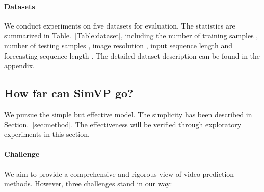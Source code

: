 \documentclass[10pt,twocolumn,letterpaper]{article}
\begin{document}
\paragraph{Datasets} We conduct experiments on five datasets for evaluation. The statistics are summarized in Table.~\ref{Table:dataset}, including the number of training samples , number of testing samples , image resolution , input sequence length  and forecasting sequence length . The detailed dataset description can be found in the appendix.

\begin{table}[h]
  \centering
  \caption{The statistics of datasets. The training or testing set has  or  samples, each of which consists  or  images with the shape .}
  
      \label{Table:dataset}
\end{table}


\vspace{-3mm}
\subsection{How far can SimVP go?}
We pursue the simple but effective model. The simplicity has been described in Section.~\ref{sec:method}. The effectiveness will be verified through exploratory experiments in this section.


\vspace{-3mm}
\paragraph{Challenge} We aim to provide a comprehensive and rigorous view of video prediction methods. However, three challenges stand in our way:
\end{document}
